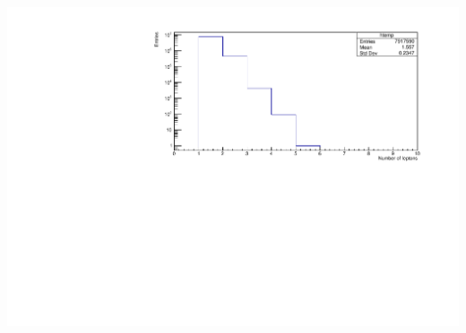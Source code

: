 \documentclass[12pt, a4paper, bibliography=totoc]{scrartcl}
\begin{document}
\begin{multicols}{2}
\begin{center}
	\includegraphics[width=\linewidth]{fig/lep_n_final.pdf}
	\label{lep_n}
\end{center}


\end{multicols}
\end{document}
